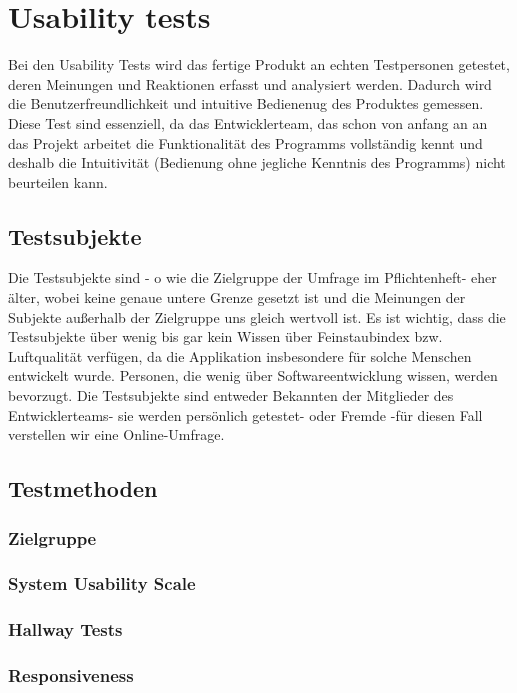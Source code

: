 \section{Usability tests}

Bei den Usability Tests wird das fertige Produkt an echten Testpersonen getestet, deren  Meinungen und Reaktionen erfasst und analysiert werden. Dadurch wird die Benutzerfreundlichkeit und intuitive Bedienenug des Produktes gemessen. Diese Test sind essenziell, da das Entwicklerteam, das schon von anfang an an das Projekt arbeitet die Funktionalität des Programms vollständig kennt und deshalb die Intuitivität (Bedienung ohne jegliche Kenntnis des Programms) nicht beurteilen kann.

\subsection{Testsubjekte}

Die Testsubjekte sind - o wie die Zielgruppe der Umfrage im Pflichtenheft- eher älter, wobei keine genaue untere Grenze gesetzt ist und die Meinungen der Subjekte außerhalb der Zielgruppe uns gleich wertvoll ist. Es ist wichtig, dass die Testsubjekte über wenig bis gar kein Wissen über Feinstaubindex bzw. Luftqualität verfügen, da die Applikation insbesondere für solche Menschen entwickelt wurde. Personen, die wenig über Softwareentwicklung wissen, werden bevorzugt. Die Testsubjekte sind entweder Bekannten der Mitglieder des Entwicklerteams- sie werden persönlich getestet- oder Fremde -für diesen Fall verstellen wir eine Online-Umfrage. 

\subsection{Testmethoden} 
\subsubsection{Zielgruppe}
\subsubsection{System Usability Scale}
\subsubsection{Hallway Tests}
\subsubsection{Responsiveness}

